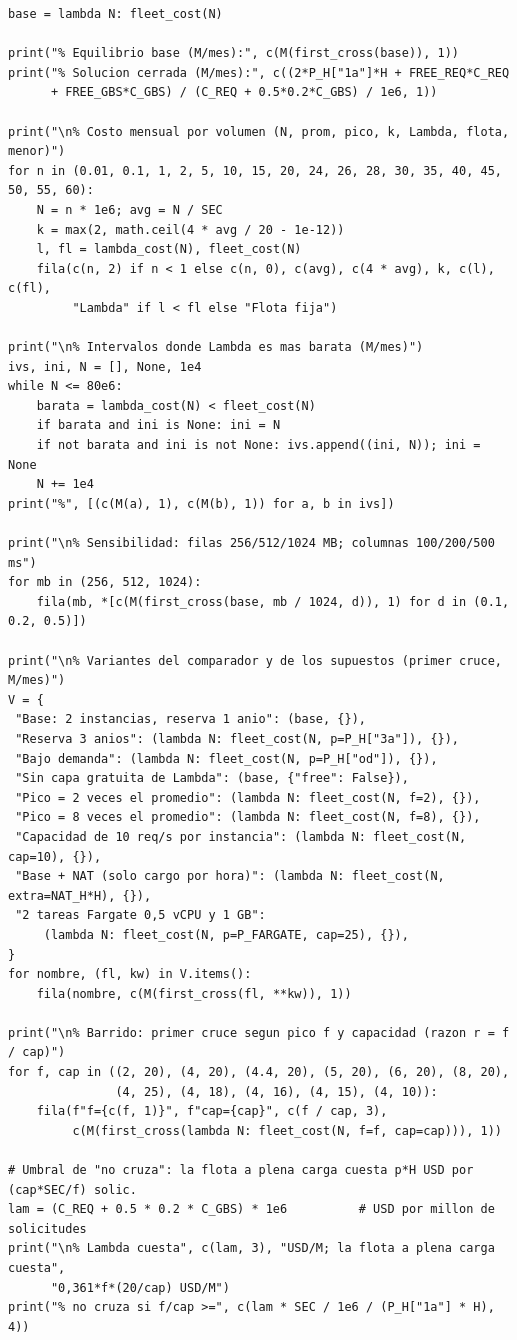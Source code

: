 \documentclass[12pt, letterpaper, table, xcdraw]{inf-pucv}
\begin{document}
{\begin{verbatim}
base = lambda N: fleet_cost(N)

print("% Equilibrio base (M/mes):", c(M(first_cross(base)), 1))
print("% Solucion cerrada (M/mes):", c((2*P_H["1a"]*H + FREE_REQ*C_REQ
      + FREE_GBS*C_GBS) / (C_REQ + 0.5*0.2*C_GBS) / 1e6, 1))

print("\n% Costo mensual por volumen (N, prom, pico, k, Lambda, flota, menor)")
for n in (0.01, 0.1, 1, 2, 5, 10, 15, 20, 24, 26, 28, 30, 35, 40, 45, 50, 55, 60):
    N = n * 1e6; avg = N / SEC
    k = max(2, math.ceil(4 * avg / 20 - 1e-12))
    l, fl = lambda_cost(N), fleet_cost(N)
    fila(c(n, 2) if n < 1 else c(n, 0), c(avg), c(4 * avg), k, c(l), c(fl),
         "Lambda" if l < fl else "Flota fija")

print("\n% Intervalos donde Lambda es mas barata (M/mes)")
ivs, ini, N = [], None, 1e4
while N <= 80e6:
    barata = lambda_cost(N) < fleet_cost(N)
    if barata and ini is None: ini = N
    if not barata and ini is not None: ivs.append((ini, N)); ini = None
    N += 1e4
print("%", [(c(M(a), 1), c(M(b), 1)) for a, b in ivs])

print("\n% Sensibilidad: filas 256/512/1024 MB; columnas 100/200/500 ms")
for mb in (256, 512, 1024):
    fila(mb, *[c(M(first_cross(base, mb / 1024, d)), 1) for d in (0.1, 0.2, 0.5)])

print("\n% Variantes del comparador y de los supuestos (primer cruce, M/mes)")
V = {
 "Base: 2 instancias, reserva 1 anio": (base, {}),
 "Reserva 3 anios": (lambda N: fleet_cost(N, p=P_H["3a"]), {}),
 "Bajo demanda": (lambda N: fleet_cost(N, p=P_H["od"]), {}),
 "Sin capa gratuita de Lambda": (base, {"free": False}),
 "Pico = 2 veces el promedio": (lambda N: fleet_cost(N, f=2), {}),
 "Pico = 8 veces el promedio": (lambda N: fleet_cost(N, f=8), {}),
 "Capacidad de 10 req/s por instancia": (lambda N: fleet_cost(N, cap=10), {}),
 "Base + NAT (solo cargo por hora)": (lambda N: fleet_cost(N, extra=NAT_H*H), {}),
 "2 tareas Fargate 0,5 vCPU y 1 GB":
     (lambda N: fleet_cost(N, p=P_FARGATE, cap=25), {}),
}
for nombre, (fl, kw) in V.items():
    fila(nombre, c(M(first_cross(fl, **kw)), 1))

print("\n% Barrido: primer cruce segun pico f y capacidad (razon r = f / cap)")
for f, cap in ((2, 20), (4, 20), (4.4, 20), (5, 20), (6, 20), (8, 20),
               (4, 25), (4, 18), (4, 16), (4, 15), (4, 10)):
    fila(f"f={c(f, 1)}", f"cap={cap}", c(f / cap, 3),
         c(M(first_cross(lambda N: fleet_cost(N, f=f, cap=cap))), 1))

# Umbral de "no cruza": la flota a plena carga cuesta p*H USD por (cap*SEC/f) solic.
lam = (C_REQ + 0.5 * 0.2 * C_GBS) * 1e6          # USD por millon de solicitudes
print("\n% Lambda cuesta", c(lam, 3), "USD/M; la flota a plena carga cuesta",
      "0,361*f*(20/cap) USD/M")
print("% no cruza si f/cap >=", c(lam * SEC / 1e6 / (P_H["1a"] * H), 4))
\end{verbatim}
}
\end{document}
